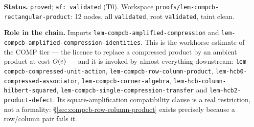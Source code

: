 \medskip
\noindent\textbf{Status.} \texttt{proved}; \texttt{af: validated} (T0). Workspace
\texttt{proofs/lem-compcb-rectangular-product}: 12 nodes, all \texttt{validated}, root
\texttt{validated}, taint clean.

\noindent\textbf{Role in the chain.} Imports
\texttt{lem-compcb-amplified-compression} and
\texttt{lem-compcb-amplified-compression-identities}. This is the workhorse estimate of
the COMP tier --- the licence to replace a compressed product by an ambient product at
cost $O(e)$ --- and it is invoked by almost everything downstream:
\texttt{lem-compcb-compressed-unit-action}, \texttt{lem-compcb-row-column-product},
\texttt{lem-hcb0-compressed-associator}, \texttt{lem-compcb-corner-algebra},
\texttt{lem-hcb-column-hilbert-squared},
\texttt{lem-compcb-single-compression-transfer} and
\texttt{lem-hcb2-product-defect}. Its square-amplification compatibility clause is a real
restriction, not a formality: \S\ref{sec:compcb-row-column-product} exists precisely
because a row/column pair fails it.
